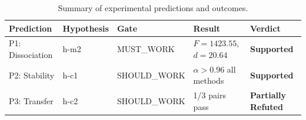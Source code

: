 \begin{table}[h]
\centering
\begin{tabular}{@{}lllll@{}}
\toprule
Prediction & Hypothesis & Gate & Result & Verdict \\
\midrule
P1: Dissociation & h-m2 & MUST\_WORK & $F=1423.55$, $d=20.64$ & \textbf{Supported} \\
P2: Stability & h-c1 & SHOULD\_WORK & $\alpha > 0.96$ all methods & \textbf{Supported} \\
P3: Transfer & h-c2 & SHOULD\_WORK & 1/3 pairs pass & \textbf{Partially Refuted} \\
\bottomrule
\end{tabular}
\caption{Summary of experimental predictions and outcomes.}
\label{tab:summary}
\end{table}
